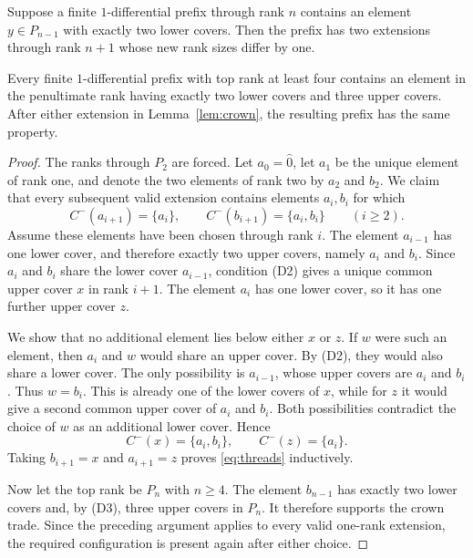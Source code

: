 \documentclass[10pt,a4paper]{amsart}
\newcommand{\cminus}{C^{-}}
\begin{document}
\begin{lemma}\label{lem:crown}
Suppose a finite $1$-differential prefix through rank $n$ contains an element $y\in P_{n-1}$ with exactly two lower covers. Then the prefix has two extensions through rank $n+1$ whose new rank sizes differ by one.
\end{lemma}

\begin{lemma}\label{lem:persistent}
Every finite $1$-differential prefix with top rank at least four contains an element in the penultimate rank having exactly two lower covers and three upper covers. After either extension in Lemma~\ref{lem:crown}, the resulting prefix has the same property.
\end{lemma}

\begin{proof}
The ranks through $P_2$ are forced. Let $a_0=\widehat{0}$, let $a_1$ be the unique element of rank one, and denote the two elements of rank two by $a_2$ and $b_2$. We claim that every subsequent valid extension contains elements $a_i,b_i$ for which
\begin{equation}
\cminus(a_{i+1})=\{a_i\},
\qquad
\cminus(b_{i+1})=\{a_i,b_i\}
\qquad (i\geq2).
\label{eq:threads}
\end{equation}
Assume these elements have been chosen through rank $i$. The element $a_{i-1}$ has one lower cover, and therefore exactly two upper covers, namely $a_i$ and $b_i$. Since $a_i$ and $b_i$ share the lower cover $a_{i-1}$, condition (D2) gives a unique common upper cover $x$ in rank $i+1$. The element $a_i$ has one lower cover, so it has one further upper cover $z$.

We show that no additional element lies below either $x$ or $z$. If $w$ were such an element, then $a_i$ and $w$ would share an upper cover. By (D2), they would also share a lower cover. The only possibility is $a_{i-1}$, whose upper covers are $a_i$ and $b_i$. Thus $w=b_i$. This is already one of the lower covers of $x$, while for $z$ it would give a second common upper cover of $a_i$ and $b_i$. Both possibilities contradict the choice of $w$ as an additional lower cover. Hence
\[
\cminus(x)=\{a_i,b_i\},
\qquad
\cminus(z)=\{a_i\}.
\]
Taking $b_{i+1}=x$ and $a_{i+1}=z$ proves \eqref{eq:threads} inductively.

Now let the top rank be $P_n$ with $n\geq4$. The element $b_{n-1}$ has exactly two lower covers and, by (D3), three upper covers in $P_n$. It therefore supports the crown trade. Since the preceding argument applies to every valid one-rank extension, the required configuration is present again after either choice.
\end{proof}
\end{document}
